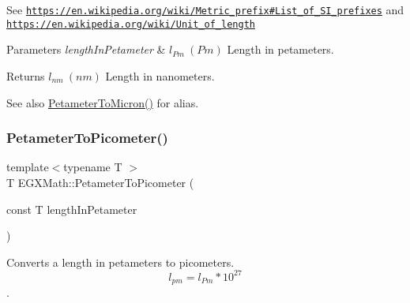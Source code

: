 See \href{https://en.wikipedia.org/wiki/Metric_prefix#List_of_SI_prefixes}{\tt https\+://en.\+wikipedia.\+org/wiki/\+Metric\+\_\+prefix\#\+List\+\_\+of\+\_\+\+S\+I\+\_\+prefixes} and \href{https://en.wikipedia.org/wiki/Unit_of_length}{\tt https\+://en.\+wikipedia.\+org/wiki/\+Unit\+\_\+of\+\_\+length} 
\begin{DoxyParams}{Parameters}
{\em length\+In\+Petameter} & $ l_{Pm}\ (Pm)$ Length in petameters. \\
\hline
\end{DoxyParams}
\begin{DoxyReturn}{Returns}
$ l_{nm}\ (nm)$ Length in nanometers. 
\end{DoxyReturn}
\begin{DoxySeeAlso}{See also}
\mbox{\hyperlink{group___e_g_x_math-_conversions-_length_conversions-_petameter-_non-_s_i_gad1c1c26c232339c6304962d20cb29252}{Petameter\+To\+Micron()}} for alias. 
\end{DoxySeeAlso}
\mbox{\label{group___e_g_x_math-_conversions-_length_conversions-_petameter-_s_i_ga092df775702bdd1b027e20a243d0aa75}} 
\subsubsection{\texorpdfstring{Petameter\+To\+Picometer()}{PetameterToPicometer()}}
{\footnotesize\ttfamily template$<$typename T $>$ \\
T E\+G\+X\+Math\+::\+Petameter\+To\+Picometer (\begin{DoxyParamCaption}\item[{const T}]{length\+In\+Petameter }\end{DoxyParamCaption})}



Converts a length in petameters to picometers. \[ l_{pm}=l_{Pm} * 10^{27} \]. 

